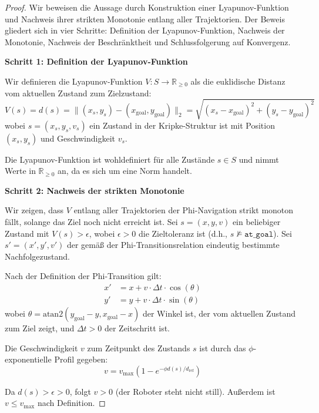 ﻿\documentclass[a4paper,12pt]{article}
\theoremstyle{definition}
\begin{document}
\begin{proof}
Wir beweisen die Aussage durch Konstruktion einer Lyapunov-Funktion und Nachweis ihrer strikten Monotonie entlang aller Trajektorien. Der Beweis gliedert sich in vier Schritte: Definition der Lyapunov-Funktion, Nachweis der Monotonie, Nachweis der Beschränktheit und Schlussfolgerung auf Konvergenz.

\textbf{Schritt 1: Definition der Lyapunov-Funktion}

Wir definieren die Lyapunov-Funktion $V: S \to \mathbb{R}_{\geq 0}$ als die euklidische Distanz vom aktuellen Zustand zum Zielzustand:
\begin{equation}
V(s) = d(s) = \|(x_s, y_s) - (x_{\text{goal}}, y_{\text{goal}})\|_2 = \sqrt{(x_s - x_{\text{goal}})^2 + (y_s - y_{\text{goal}})^2}
\end{equation}
wobei $s = (x_s, y_s, v_s)$ ein Zustand in der Kripke-Struktur ist mit Position $(x_s, y_s)$ und Geschwindigkeit $v_s$.

Die Lyapunov-Funktion ist wohldefiniert für alle Zustände $s \in S$ und nimmt Werte in $\mathbb{R}_{\geq 0}$ an, da es sich um eine Norm handelt.

\textbf{Schritt 2: Nachweis der strikten Monotonie}

Wir zeigen, dass $V$ entlang aller Trajektorien der Phi-Navigation strikt monoton fällt, solange das Ziel noch nicht erreicht ist. Sei $s = (x, y, v)$ ein beliebiger Zustand mit $V(s) > \epsilon$, wobei $\epsilon > 0$ die Zieltoleranz ist (d.h., $s \not\models \texttt{at\_goal}$). Sei $s' = (x', y', v')$ der gemäß der Phi-Transitionsrelation eindeutig bestimmte Nachfolgezustand.

Nach der Definition der Phi-Transition gilt:
\begin{align}
x' &= x + v \cdot \Delta t \cdot \cos(\theta) \\
y' &= y + v \cdot \Delta t \cdot \sin(\theta)
\end{align}
wobei $\theta = \text{atan2}(y_{\text{goal}} - y, x_{\text{goal}} - x)$ der Winkel ist, der vom aktuellen Zustand zum Ziel zeigt, und $\Delta t > 0$ der Zeitschritt ist.

Die Geschwindigkeit $v$ zum Zeitpunkt des Zustands $s$ ist durch das $\phi$-exponentielle Profil gegeben:
\begin{equation}
v = v_{\max}(1 - e^{-\phi d(s)/d_{\text{ref}}})
\end{equation}

Da $d(s) > \epsilon > 0$, folgt $v > 0$ (der Roboter steht nicht still). Außerdem ist $v \leq v_{\max}$ nach Definition.


\end{proof}
\end{document}
